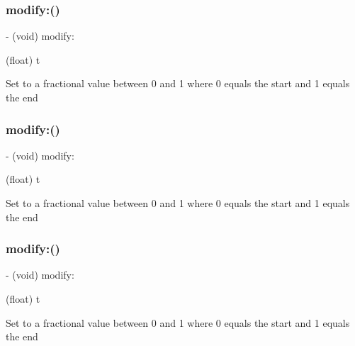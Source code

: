 \subsubsection{\texorpdfstring{modify\+:()}{modify:()}\hspace{0.1cm}{\footnotesize\ttfamily [1/4]}}
{\footnotesize\ttfamily -\/ (void) modify\+: \begin{DoxyParamCaption}\item[{(float)}]{t }\end{DoxyParamCaption}}

Set to a fractional value between 0 and 1 where 0 equals the start and 1 equals the end \mbox{\label{interfaceCDPropertyModifier_a8c2d8d098bc743ad13d80271a03f15d6}} 
\subsubsection{\texorpdfstring{modify\+:()}{modify:()}\hspace{0.1cm}{\footnotesize\ttfamily [2/4]}}
{\footnotesize\ttfamily -\/ (void) modify\+: \begin{DoxyParamCaption}\item[{(float)}]{t }\end{DoxyParamCaption}}

Set to a fractional value between 0 and 1 where 0 equals the start and 1 equals the end \mbox{\label{interfaceCDPropertyModifier_a8c2d8d098bc743ad13d80271a03f15d6}} 
\subsubsection{\texorpdfstring{modify\+:()}{modify:()}\hspace{0.1cm}{\footnotesize\ttfamily [3/4]}}
{\footnotesize\ttfamily -\/ (void) modify\+: \begin{DoxyParamCaption}\item[{(float)}]{t }\end{DoxyParamCaption}}

Set to a fractional value between 0 and 1 where 0 equals the start and 1 equals the end \mbox{\label{interfaceCDPropertyModifier_a8c2d8d098bc743ad13d80271a03f15d6}} 
